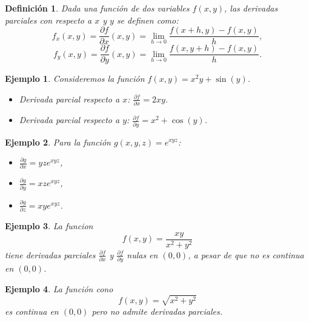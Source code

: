 \documentclass[11pt]{book}
\theoremstyle{definicion}
\theoremstyle{teorema}
\theoremstyle{ejemplo}
\newtheorem{definition}{Definición}
\newtheorem{example}{Ejemplo}
\begin{document}
\begin{definition}
%    
Dada una función de dos variables \(f(x, y)\), las derivadas parciales con respecto a \(x\) y \(y\) se definen como:
\[ f_x(x, y) = \frac{\partial f}{\partial x}(x,y) = \lim_{h \to 0} \frac{f(x + h, y) - f(x, y)}{h}, \]
\[ f_y(x, y) = \frac{\partial f}{\partial y}(x,y)= \lim_{h \to 0} \frac{f(x, y + h) - f(x, y)}{h}. \]
\end{definition}


\begin{example}
Consideremos la función \( f(x, y) = x^2 y + \sin(y) \).
\begin{itemize}
    \item Derivada parcial respecto a \( x \): \( \frac{\partial f}{\partial x} = 2xy \).
    \item Derivada parcial respecto a \( y \): \( \frac{\partial f}{\partial y} = x^2 + \cos(y) \).
\end{itemize}
\end{example}

\begin{example}
Para la función \( g(x, y, z) = e^{xyz} \):
\begin{itemize}
    \item \( \frac{\partial g}{\partial x} = yz e^{xyz} \),
    \item \( \frac{\partial g}{\partial y} = xz e^{xyz} \),
    \item \( \frac{\partial g}{\partial z} = xy e^{xyz} \).
\end{itemize}
\end{example}

\begin{example}
La funcion
    $$ %
    f(x,y)=\frac{xy}{x^{2}+y^{2}}$$
tiene derivadas parciales $\frac{\partial f}{\partial x}$ y $\frac{\partial f}{\partial y}$ nulas en $(0,0)$, a pesar de que no es continua en $(0,0)$.
\end{example}

\begin{example}
    La funci\'on cono 
    \[
    f(x,y) = \sqrt{x^2+y^2}
    \]
    es continua en $(0,0)$ pero no admite derivadas parciales.
\end{example}
\end{document}
